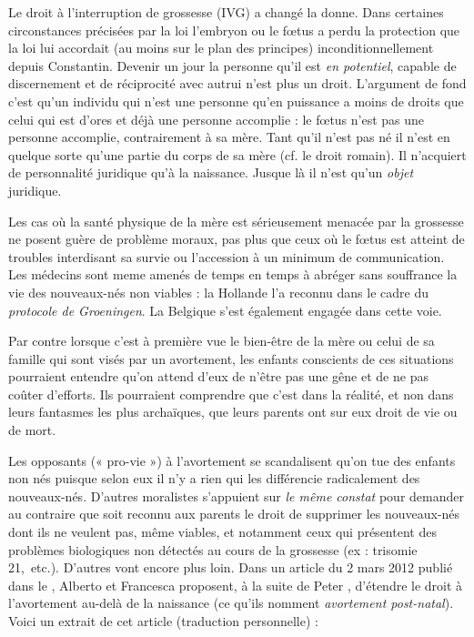  Le droit à l'interruption de grossesse (IVG) a changé la donne. Dans certaines circonstances précisées par la loi l'embryon ou le fœtus a perdu la protection que la loi lui accordait (au moins sur le plan des principes) inconditionnellement depuis Constantin. Devenir un jour la personne qu'il est \emph{en potentiel}, capable de discernement et de réciprocité avec autrui  n'est plus un droit. L'argument de fond c'est qu'un individu qui n'est une personne qu'en puissance a moins de droits que celui qui est d'ores et déjà une personne accomplie : le fœtus n'est pas une personne accomplie, contrairement à sa mère. Tant qu'il n'est pas né il n'est en quelque sorte qu'une partie du corps de sa mère (cf. le droit romain). Il n'acquiert de personnalité juridique qu'à la naissance. Jusque là il n'est qu'un \emph{objet} juridique. 

 Les cas où la santé physique de la mère est sérieusement menacée par la grossesse ne posent guère de problème moraux, pas plus que ceux où le fœtus est atteint de troubles interdisant sa survie ou l'accession à un minimum de communication. Les médecins sont meme amenés de temps en temps à abréger sans souffrance la vie des nouveaux-nés non viables : la Hollande l'a reconnu dans le cadre du \emph{protocole de Groeningen}. La Belgique s'est également engagée dans cette voie. 
 
 Par contre lorsque c'est à première vue le bien-être de la mère ou celui de sa famille qui sont visés par un avortement, les enfants conscients de ces situations pourraient entendre qu'on attend d'eux de n'être pas une gêne et de ne pas coûter d'efforts. Ils pourraient comprendre que c'est dans la réalité, et non dans leurs fantasmes les plus archaïques, que leurs parents ont sur eux droit de vie ou de mort.

 Les opposants (« pro-vie ») à l'avortement se scandalisent qu'on tue des enfants non nés puisque selon eux il n'y a rien qui les différencie radicalement des nouveaux-nés. D'autres moralistes s'appuient sur  \emph{le même constat} pour demander au contraire que soit reconnu aux parents le droit de supprimer les nouveaux-nés dont ils ne veulent pas, même viables, et notamment ceux qui présentent des problèmes biologiques non détectés au cours de la grossesse (ex : trisomie 21,~etc.). D'autres vont encore plus loin. Dans un article du 2 mars 2012 publié dans le , Alberto  et Francesca  proposent, à la suite de Peter , d'étendre le droit à l'avortement au-delà de la naissance (ce qu'ils nomment \emph{avortement post-natal}). Voici un extrait de cet article (traduction personnelle) :

